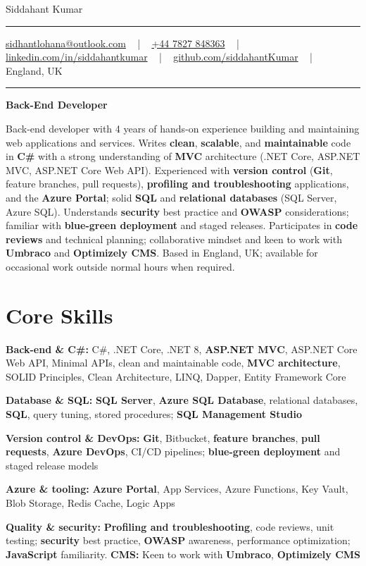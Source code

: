 \documentclass[letterpaper,10pt]{article}
\newcommand{\documentTitle}[2]{
  \begin{center}
    \vspace*{-0.3in}
    {\Huge\color{accentTitle} #1}
    \vspace{8pt}
    {\color{accentLine} \hrule}
    \vspace{2pt}
    \footnotesize{#2}
    \vspace{2pt}
    {\color{accentLine} \hrule}
  \end{center}
}
\newenvironment{resume_list}{
  \vspace{-7pt}
  \begin{itemize}[itemsep=-2px, parsep=1pt, leftmargin=30pt]
}{
  \end{itemize}
}
\begin{document}
\documentTitle{Siddahant Kumar}{
\vspace{0.1cm}
\href{mailto:sidhantlohana@outlook.com}{sidhantlohana@outlook.com} ~ | ~
\href{tel:+447827848363}{+44 7827 848363} ~ | ~
\href{https://www.linkedin.com/in/siddahantkumar/}{linkedin.com/in/siddahantkumar} ~ | ~
\href{https://github.com/siddahantKumar}{github.com/siddahantKumar} ~ | ~
England, UK
}

\begin{center}
\textbf{Back-End Developer}
\end{center}

Back-end developer with 4 years of hands-on experience building and maintaining web applications and services. Writes \textbf{clean}, \textbf{scalable}, and \textbf{maintainable} code in \textbf{C\#} with a strong understanding of \textbf{MVC} architecture (.NET Core, ASP.NET MVC, ASP.NET Core Web API). Experienced with \textbf{version control} (\textbf{Git}, feature branches, pull requests), \textbf{profiling and troubleshooting} applications, and the \textbf{Azure Portal}; solid \textbf{SQL} and \textbf{relational databases} (SQL Server, Azure SQL). Understands \textbf{security} best practice and \textbf{OWASP} considerations; familiar with \textbf{blue-green deployment} and staged releases. Participates in \textbf{code reviews} and technical planning; collaborative mindset and keen to work with \textbf{Umbraco} and \textbf{Optimizely CMS}. Based in England, UK; available for occasional work outside normal hours when required.


\section{Core Skills}

\begin{resume_list}
    \item \textbf{Back-end \& C\#:} C\#, .NET Core, .NET 8, \textbf{ASP.NET MVC}, ASP.NET Core Web API, Minimal APIs, clean and maintainable code, \textbf{MVC architecture}, SOLID Principles, Clean Architecture, LINQ, Dapper, Entity Framework Core
    \item \textbf{Database \& SQL:} \textbf{SQL Server}, \textbf{Azure SQL Database}, relational databases, \textbf{SQL}, query tuning, stored procedures; \textbf{SQL Management Studio}
    \item \textbf{Version control \& DevOps:} \textbf{Git}, Bitbucket, \textbf{feature branches}, \textbf{pull requests}, \textbf{Azure DevOps}, CI/CD pipelines; \textbf{blue-green deployment} and staged release models
    \item \textbf{Azure \& tooling:} \textbf{Azure Portal}, App Services, Azure Functions, Key Vault, Blob Storage, Redis Cache, Logic Apps
    \item \textbf{Quality \& security:} \textbf{Profiling and troubleshooting}, code reviews, unit testing; \textbf{security} best practice, \textbf{OWASP} awareness, performance optimization; \textbf{JavaScript} familiarity. \textbf{CMS:} Keen to work with \textbf{Umbraco}, \textbf{Optimizely CMS}
\end{resume_list}
\end{document}
